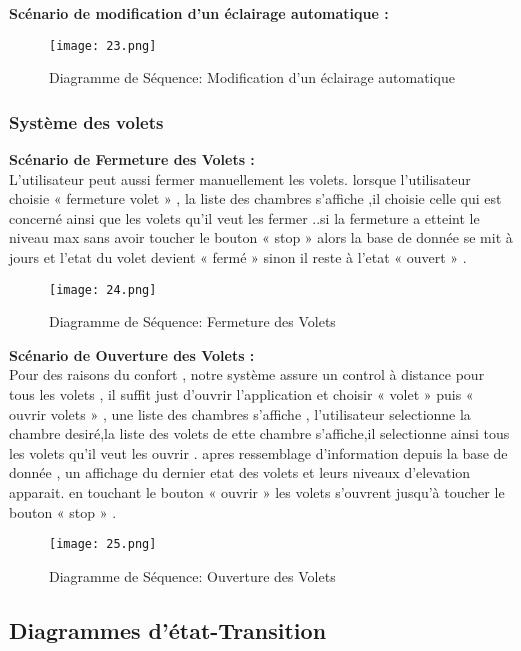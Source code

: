 \begin{spacing}{1.2}
 \newpage
 
 \textbf{Scénario de modification d’un éclairage automatique :}
\begin{figure}[H]\centering
\texttt{[image: 23.png]}
\caption{Diagramme de Séquence: Modification d’un éclairage automatique}
\label{fig:fig3}
\end{figure}
 
\subsubsection{Système des volets }

\textbf{Scénario de Fermeture des Volets :} \\
L’utilisateur peut aussi fermer manuellement les volets. lorsque l’utilisateur choisie « fermeture volet » , la liste des chambres s’affiche  ,il choisie celle qui est concerné  ainsi que  les volets qu’il veut les fermer ..si la fermeture a etteint le niveau max sans avoir toucher le bouton « stop » alors la base de donnée se mit à jours et l’etat du volet devient « fermé » sinon il reste à l’etat « ouvert » . 

\begin{figure}[H]\centering
\texttt{[image: 24.png]}
\caption{Diagramme de Séquence: Fermeture des Volets}
\label{fig:fig3}
\end{figure}

\newpage

\textbf{Scénario de Ouverture des Volets :} \\
Pour des raisons du confort , notre système assure un control à distance pour tous les volets , il suffit just d’ouvrir l’application et choisir « volet » puis « ouvrir volets » , une liste des chambres s’affiche  , l’utilisateur selectionne la chambre desiré,la liste des volets de ette chambre s’affiche,il selectionne ainsi tous les volets qu’il veut les ouvrir . apres ressemblage d’information depuis la base de donnée , un affichage du dernier etat des volets et leurs niveaux d’elevation apparait. en touchant  le bouton « ouvrir » les volets s’ouvrent jusqu’à toucher le bouton « stop » . 
\begin{figure}[H]\centering
\texttt{[image: 25.png]}
\caption{Diagramme de Séquence: Ouverture des Volets}
\label{fig:fig3}
\end{figure}

\newpage

\subsection{Diagrammes d’état-Transition}


\end{spacing}

